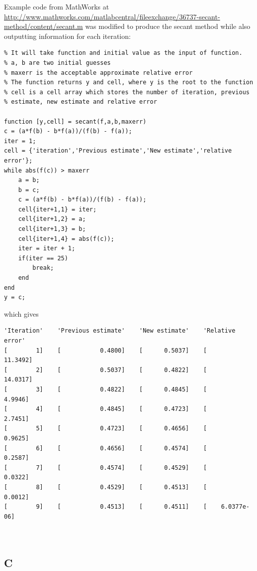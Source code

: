 \documentclass{article}
\begin{document}
Example code from MathWorks at \href{http://www.mathworks.com/matlabcentral/fileexchange/36737-secant-method/content/secant.m}{http://www.mathworks.com/matlabcentral/fileexchange/36737-secant-method/content/secant.m} was modified to produce the secant method while also outputting information for each iteration:

\begin{lstlisting}
% It will take function and initial value as the input of function. 
% a, b are two initial guesses
% maxerr is the acceptable approximate relative error
% The function returns y and cell, where y is the root to the function
% cell is a cell array which stores the number of iteration, previous
% estimate, new estimate and relative error

function [y,cell] = secant(f,a,b,maxerr)
c = (a*f(b) - b*f(a))/(f(b) - f(a));
iter = 1;       
cell = {'iteration','Previous estimate','New estimate','relative error'};
while abs(f(c)) > maxerr
    a = b;
    b = c;
    c = (a*f(b) - b*f(a))/(f(b) - f(a));
    cell{iter+1,1} = iter;
    cell{iter+1,2} = a;
    cell{iter+1,3} = b;
    cell{iter+1,4} = abs(f(c));
    iter = iter + 1;
    if(iter == 25)
        break;
    end
end
y = c;
\end{lstlisting}

\hspace{20pt}

\noindent which gives

\begin{lstlisting}
'Iteration'    'Previous estimate'    'New estimate'    'Relative error'
[        1]    [           0.4800]    [      0.5037]    [       11.3492]
[        2]    [           0.5037]    [      0.4822]    [       14.0317]
[        3]    [           0.4822]    [      0.4845]    [        4.9946]
[        4]    [           0.4845]    [      0.4723]    [        2.7451]
[        5]    [           0.4723]    [      0.4656]    [        0.9625]
[        6]    [           0.4656]    [      0.4574]    [        0.2587]
[        7]    [           0.4574]    [      0.4529]    [        0.0322]
[        8]    [           0.4529]    [      0.4513]    [        0.0012]
[        9]    [           0.4513]    [      0.4511]    [    6.0377e-06]



\end{lstlisting}

\subsection*{C}
\end{document}
